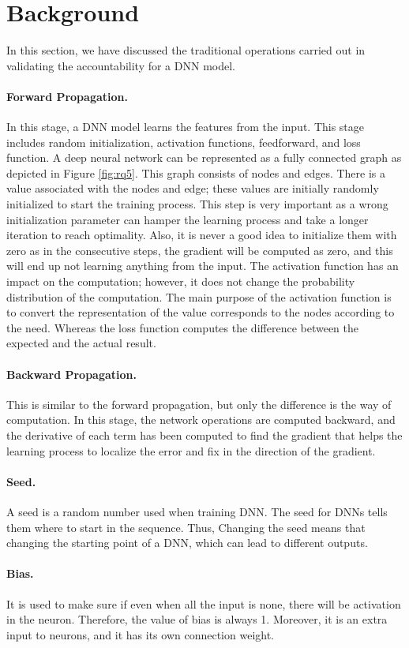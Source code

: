 \section{Background}
\label{sec:background}
In this section, we have discussed the traditional operations carried out in validating the accountability for a DNN model.
\paragraph{Forward Propagation.}  In this stage, a DNN model learns the features from the input. This stage includes random initialization, activation functions, feedforward, and loss function. A deep neural network can be represented as a fully connected graph as depicted in Figure \ref{fig:rq5}. This graph consists of nodes and edges. There is a value associated with the nodes and edge; these values are initially randomly initialized to start the training process. This step is very important as a wrong initialization parameter can hamper the learning process and take a longer iteration to reach optimality. Also, it is never a good idea to initialize them with zero as in the consecutive steps, the gradient will be computed as zero, and this will end up not learning anything from the input. The activation function has an impact on the computation; however, it does not change the probability distribution of the computation. The main purpose of the activation function is to convert the representation of the value corresponds to the nodes according to the need. Whereas the loss function computes the difference between the expected and the actual result.
\paragraph{Backward Propagation.} This is similar to the forward propagation, but only the difference is the way of computation. In this stage, the network operations are computed backward, and the derivative of each term has been computed to find the gradient that helps the learning process to localize the error and fix in the direction of the gradient.
\paragraph{Seed.} A seed is a random number used when training DNN. The seed for DNNs tells them where to start in the sequence. Thus, Changing the seed means that changing the starting point of a DNN, which can lead to different outputs.
\paragraph{Bias.} It is used to make sure if even when all the input is none, there will be activation in the neuron. Therefore, the value of bias is always 1. Moreover, it is an extra input to neurons, and it has its own connection weight. 
